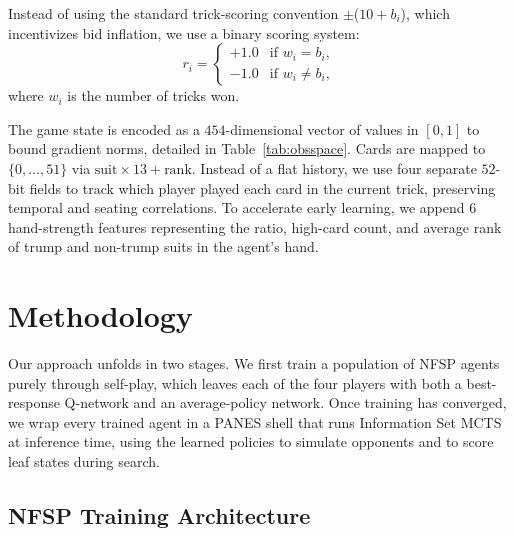 \documentclass[conference]{IEEEtran}
\begin{document}
Instead of using the standard trick-scoring convention $\pm$($10+b_i$), which incentivizes bid inflation, we use a binary scoring system:
\begin{equation}
    r_i =
    \begin{cases}
        +1.0 & \text{if } w_i = b_i, \\
        -1.0 & \text{if } w_i \neq b_i,
    \end{cases}
    \label{eq:binary_score}
\end{equation}
where $w_i$ is the number of tricks won.
 
The game state is encoded as a $454$-dimensional vector of values in $[0,1]$ to bound gradient norms, detailed in Table~\ref{tab:obsspace}. Cards are mapped to $\{0,\dots,51\}$ via $\text{suit}\times13+\text{rank}$. Instead of a flat history, we use four separate $52$-bit fields to track which player played each card in the current trick, preserving temporal and seating correlations. To accelerate early learning, we append $6$ hand-strength features representing the ratio, high-card count, and average rank of trump and non-trump suits in the agent's hand.
 
\section{\large \textbf{Methodology}}
 
Our approach unfolds in two stages. We first train a population of NFSP agents purely through self-play, which leaves each of the four players with both a best-response Q-network and an average-policy network. Once training has converged, we wrap every trained agent in a PANES shell that runs Information Set MCTS at inference time, using the learned policies to simulate opponents and to score leaf states during search.
 
\subsection{\textbf{NFSP Training Architecture}}
 
\end{document}
